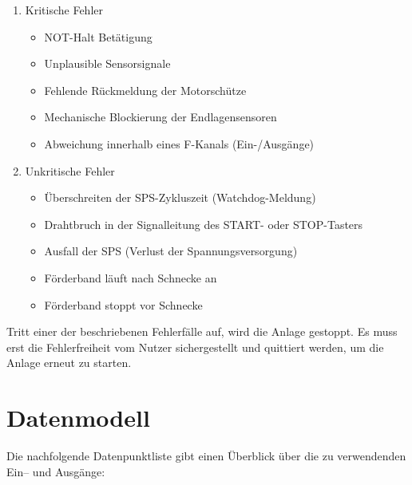 \documentclass[
	pagesize,
	fontsize=12pt,
	paper=a4,
	oneside,
   reqno
]{scrartcl}
\begin{document}
\begin{enumerate}
    \item Kritische Fehler
    \begin{itemize}
        \item NOT-Halt Betätigung
        \item Unplausible Sensorsignale
        \item Fehlende Rückmeldung der Motorschütze
        \item Mechanische Blockierung der Endlagensensoren
        \item Abweichung innerhalb eines F-Kanals (Ein-/Ausgänge)
    \end{itemize}
    \item Unkritische Fehler
    \begin{itemize}
        \item Überschreiten der SPS-Zykluszeit (Watchdog-Meldung)
        \item Drahtbruch in der Signalleitung des START- oder STOP-Tasters
        \item Ausfall der SPS (Verlust der Spannungsversorgung)
        \item Förderband läuft nach Schnecke an
        \item Förderband stoppt vor Schnecke
    \end{itemize}
\end{enumerate}

Tritt einer der beschriebenen Fehlerfälle auf, wird die Anlage gestoppt. Es muss erst die Fehlerfreiheit vom Nutzer sichergestellt und quittiert werden, um die Anlage erneut zu starten.

\section{Datenmodell}

Die nachfolgende Datenpunktliste gibt einen Überblick über die zu verwendenden Ein– und Ausgänge:
\end{document}
